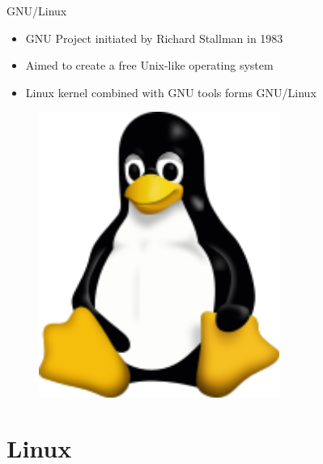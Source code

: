 \documentclass{beamer}
\begin{document}
\begin{frame}{GNU/Linux}
  \begin{minipage}[t]{0.6\textwidth}
    \begin{itemize}
      \item GNU Project initiated by Richard Stallman in 1983
      \item Aimed to create a free Unix-like operating system
      \item Linux kernel combined with GNU tools forms GNU/Linux
    \end{itemize}
  \end{minipage}
  \hfill
  \begin{minipage}[t]{0.35\textwidth}
    \begin{figure}[h]
      \includegraphics[width=0.7\textwidth]{images/tux.png}
    \end{figure}
  \end{minipage}
\end{frame}

\section{Linux}
\end{document}
